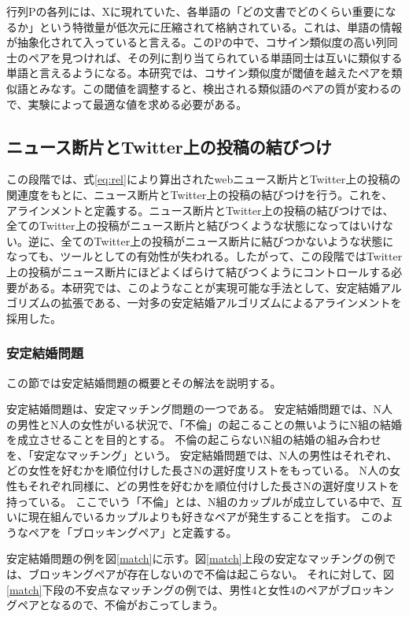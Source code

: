\documentclass[12pt]{jarticle}
\begin{document}
行列Pの各列には、Xに現れていた、各単語の「どの文書でどのくらい重要になるか」という特徴量が低次元に圧縮されて格納されている。これは、単語の情報が抽象化されて入っていると言える。このPの中で、コサイン類似度の高い列同士のペアを見つければ、その列に割り当てられている単語同士は互いに類似する単語と言えるようになる。本研究では、コサイン類似度が閾値を越えたペアを類似語とみなす。この閾値を調整すると、検出される類似語のペアの質が変わるので、実験によって最適な値を求める必要がある。

\subsection{ニュース断片とTwitter上の投稿の結びつけ}
この段階では、式\ref{eq:rel}により算出されたwebニュース断片とTwitter上の投稿の関連度をもとに、ニュース断片とTwitter上の投稿の結びつけを行う。これを、アラインメントと定義する。ニュース断片とTwitter上の投稿の結びつけでは、全てのTwitter上の投稿がニュース断片と結びつくような状態になってはいけない。逆に、全てのTwitter上の投稿がニュース断片に結びつかないような状態になっても、ツールとしての有効性が失われる。したがって、この段階ではTwitter上の投稿がニュース断片にほどよくばらけて結びつくようにコントロールする必要がある。本研究では、このようなことが実現可能な手法として、安定結婚アルゴリズム\cite{smp}の拡張である、一対多の安定結婚アルゴリズム\cite{psmp}によるアラインメントを採用した。

\subsubsection{安定結婚問題}
この節では安定結婚問題の概要とその解法を説明する。

安定結婚問題\cite{smp}は、安定マッチング問題の一つである。
安定結婚問題では、N人の男性とN人の女性がいる状況で、「不倫」の起こることの無いようにN組の結婚を成立させることを目的とする。
不倫の起こらないN組の結婚の組み合わせを、「安定なマッチング」という。
安定結婚問題では、N人の男性はそれぞれ、どの女性を好むかを順位付けした長さNの選好度リストをもっている。
N人の女性もそれぞれ同様に、どの男性を好むかを順位付けした長さNの選好度リストを持っている。
ここでいう「不倫」とは、N組のカップルが成立している中で、互いに現在組んでいるカップルよりも好きなペアが発生することを指す。
このようなペアを「ブロッキングペア」と定義する。

安定結婚問題の例を図\ref{match}に示す。図\ref{match}上段の安定なマッチングの例では、ブロッキングペアが存在しないので不倫は起こらない。
それに対して、図\ref{match}下段の不安点なマッチングの例では、男性4と女性4のペアがブロッキングペアとなるので、不倫がおこってしまう。
\end{document}
